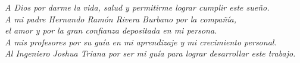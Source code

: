 \vspace*{4cm}
{
\raggedleft
\textit{A Dios por darme la vida, salud y permitirme lograr cumplir este sueño.\\
A mi padre Hernando Ramón Rivera Burbano por la compañía, \\ el amor y por la gran confianza depositada en mi persona.\\
A mis profesores por su guía en mi aprendizaje y mi crecimiento personal.\\
Al Ingeniero Joshua Triana por ser mi guía para lograr desarrollar este trabajo.\\}
}
